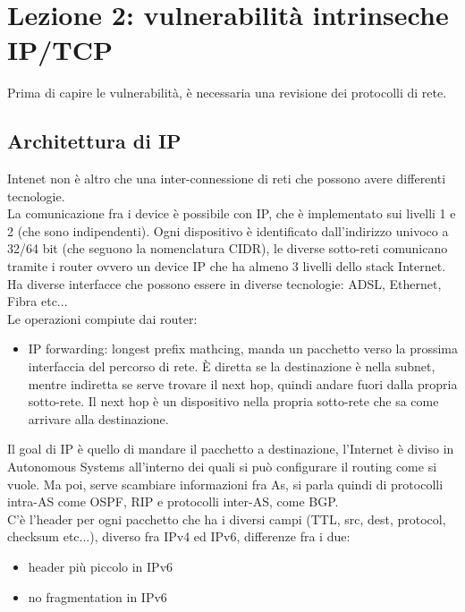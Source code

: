 \documentclass[12pt, oneside]{extbook} %
\begin{document}
\chapter{Lezione 2: vulnerabilità intrinseche IP/TCP}
Prima di capire le vulnerabilità, è necessaria una revisione dei protocolli di rete.
\section{Architettura di IP}
Intenet non è altro che una inter-connessione di reti che possono avere differenti tecnologie.\\ La comunicazione fra i device è possibile con IP, che è implementato sui livelli 1 e 2 (che sono indipendenti). Ogni dispositivo è identificato dall'indirizzo univoco a 32/64 bit (che seguono la nomenclatura CIDR), le diverse sotto-reti comunicano tramite i router ovvero un device IP che ha almeno 3 livelli dello stack Internet. Ha diverse interfacce che possono essere in diverse tecnologie: ADSL, Ethernet, Fibra etc...\\ Le operazioni compiute dai router:
\begin{itemize}
\item IP forwarding: longest prefix mathcing, manda un pacchetto verso la prossima interfaccia del percorso di rete. È diretta se la destinazione è nella subnet, mentre indiretta se serve trovare il next hop, quindi andare fuori dalla propria sotto-rete. Il next hop è un dispositivo nella propria sotto-rete che sa come arrivare alla destinazione.
\end{itemize}
Il goal di IP è quello di mandare il pacchetto a destinazione, l'Internet è diviso in Autonomous Systems all'interno dei quali si può configurare il routing come si vuole. Ma poi, serve scambiare informazioni fra As, si parla quindi di protocolli intra-AS come OSPF, RIP e protocolli inter-AS, come BGP.\\ C'è l'header per ogni pacchetto che ha i diversi campi (TTL, src, dest, protocol, checksum etc...), diverso fra IPv4 ed IPv6, differenze fra i due:
\begin{itemize}
\item header più piccolo in IPv6
\item no fragmentation in IPv6
\end{itemize}
\end{document}
